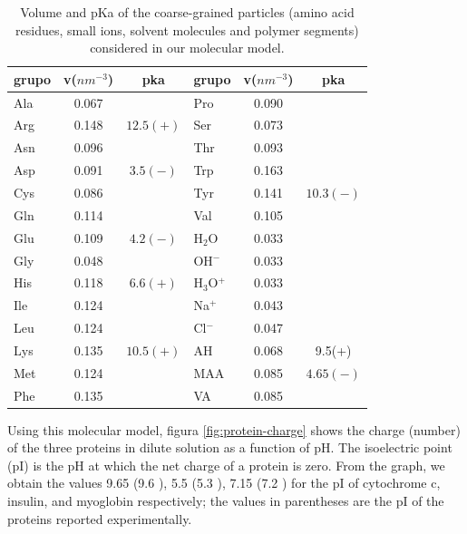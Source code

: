\begin{table}
\centering
\small
\begin{tabular}{|lcc|lcc|}
\hline
grupo & v($nm^{-3}$) & pka & grupo & v($nm^{-3}$) & pka \\
\hline
Ala & 0.067 &  & Pro & 0.090 & \\
Arg & 0.148 & $12.5 (+)$& Ser & 0.073 &\\
Asn & 0.096 &  & Thr & 0.093 & \\
Asp & 0.091 & $3.5 (-)$ & Trp & 0.163 &\\
Cys & 0.086 &  & Tyr & 0.141 & $10.3 (-)$\\
Gln & 0.114 & & Val & 0.105 &\\  
Glu & 0.109 & $4.2 (-)$ & H$_2$O & 0.033 & \\ 
Gly & 0.048 &  & OH$^-$ & 0.033 & \\
His & 0.118 & $6.6 (+)$& H$_3$O$^+$ & 0.033 &  \\ 
Ile & 0.124 &  & Na$^+$ & 0.043 & \\ %
Leu & 0.124 &  & Cl$^-$ & 0.047 & \\
Lys & 0.135 & $10.5 (+)$ & AH & 0.068 &  9.5(+)\\
Met & 0.124 & & MAA & 0.085 & $4.65(-)$\\
Phe & 0.135 &   & VA & 0.085 & \\
\hline
\end{tabular}
\caption{Volume and pKa of the coarse-grained particles (amino acid residues, small ions, solvent molecules and polymer segments)  considered in our molecular model.}
\label{table:Coarse-grain} 
\end{table}


Using this molecular model,  figura \ref{fig:protein-charge} shows the charge (number) of the three proteins in dilute solution as a function of  pH.
The isoelectric point (pI) is the pH at which the net charge of a protein is zero.
From the graph, we obtain the values  9.65 (9.6 ), 5.5 (5.3 ), 7.15 (7.2 ) for the pI of cytochrome c, insulin, and myoglobin respectively;
the values in parentheses are the pI of the proteins reported experimentally. 


